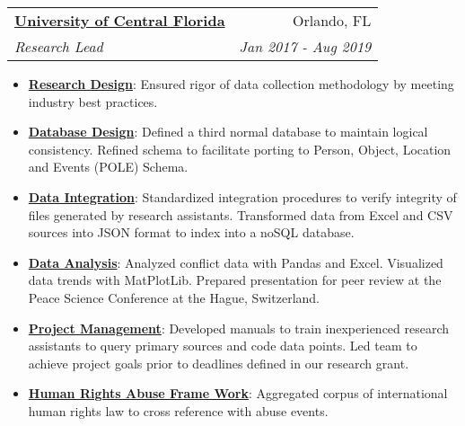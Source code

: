\documentclass[letterpaper,11pt]{article}
\makeatletter
\newcommand{\resumeItem}[2]{
  \item\small{
    \textbf{#1}{: #2 \vspace{-2pt}}
  }
}
\newcommand{\resumeSubheading}[4]{
  \vspace{-1pt}\item
    \begin{tabular*}{0.97\textwidth}[t]{l@{\extracolsep{\fill}}r}
      \textbf{#1} & #2 \\
      \textit{\small#3} & \textit{\small #4} \\
    \end{tabular*}\vspace{-5pt}
}
\newcommand{\resumeSubSubheading}[2]{
    \begin{tabular*}{0.97\textwidth}{l@{\extracolsep{\fill}}r}
      \textit{\small#1} & \textit{\small #2} \\
    \end{tabular*}\vspace{-5pt}
}
\newcommand{\resumeSubHeadingListEnd}{\end{itemize}}
\newcommand{\resumeItemListStart}{\begin{itemize}}
\newcommand{\resumeItemListEnd}{\end{itemize}\vspace{-5pt}}
\makeatother
\begin{document}

    \resumeSubheading
      {\href{https://docs.jnapolitano.io/parts/resume/work-history/docs/ucf.html}{University of Central Florida}}{Orlando, FL}
      {Research Lead}{Jan 2017 - Aug 2019}
      \resumeItemListStart
        \resumeItem{\href{https://docs.jnapolitano.io/parts/analysis/political-analysis/terrorism-conflict/project-turkish-kurdish/pdf.htm}{Research Design}}
          {Ensured rigor of data collection methodology by meeting industry best practices.}
        \resumeItem{\href{https://docs.jnapolitano.io/parts/analysis/political-analysis/terrorism-conflict/project-turkish-kurdish/database_schema.html}{Database Design}}
          {Defined a third normal database to maintain logical consistency.  Refined schema to facilitate porting to Person, Object, Location and Events (POLE) Schema.}
        \resumeItem{\href{https://docs.jnapolitano.io/parts/data/data-integration/index.html}{Data Integration}}
          {Standardized integration procedures to verify integrity of files generated by research assistants. Transformed data from Excel and CSV sources into JSON format to index into a noSQL database.}
        \resumeItem{\href{https://docs.jnapolitano.io/parts/analysis/political-analysis/terrorism-conflict/project-turkish-kurdish/analysis.html}{Data Analysis}}
          {Analyzed conflict data with Pandas and Excel.  Visualized data trends with MatPlotLib.  Prepared presentation for peer review at the Peace Science Conference at the Hague, Switzerland.}
        \resumeItem{\href{https://docs.jnapolitano.io/parts/analysis/political-analysis/terrorism-conflict/project-turkish-kurdish/pdf.html}{Project Management}}
          {Developed manuals to train inexperienced research assistants to query primary sources and code data points.  Led team to achieve project goals prior to deadlines defined in our research grant.}
        \resumeItem{\href{https://docs.jnapolitano.io/parts/analysis/political-analysis/human-rights-law/index.html}{Human Rights Abuse Frame Work}}
          {Aggregated corpus of international human rights law to cross reference with abuse events.}
    \resumeItemListEnd
\end{document}
